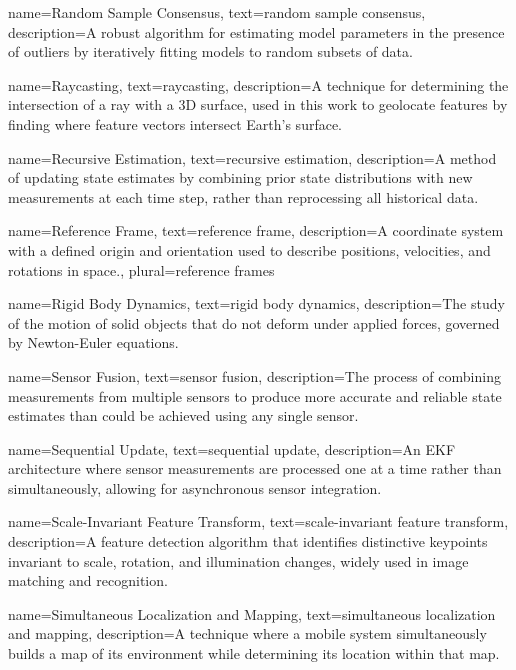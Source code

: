 {
	name=Random Sample Consensus,
	text=random sample consensus,
	description={A robust algorithm for estimating model parameters in the presence of outliers by iteratively fitting models to random subsets of data.}
}

{
	name=Raycasting,
	text=raycasting,
	description={A technique for determining the intersection of a ray with a 3D surface, used in this work to geolocate features by finding where feature vectors intersect Earth's surface.}
}

{
	name=Recursive Estimation,
	text=recursive estimation,
	description={A method of updating state estimates by combining prior state distributions with new measurements at each time step, rather than reprocessing all historical data.}
}

{
	name=Reference Frame,
	text=reference frame,
	description={A coordinate system with a defined origin and orientation used to describe positions, velocities, and rotations in space.},
	plural=reference frames
}

{
	name=Rigid Body Dynamics,
	text=rigid body dynamics,
	description={The study of the motion of solid objects that do not deform under applied forces, governed by Newton-Euler equations.}
}

{
	name=Sensor Fusion,
	text=sensor fusion,
	description={The process of combining measurements from multiple sensors to produce more accurate and reliable state estimates than could be achieved using any single sensor.}
}

{
	name=Sequential Update,
	text=sequential update,
	description={An EKF architecture where sensor measurements are processed one at a time rather than simultaneously, allowing for asynchronous sensor integration.}
}

{
	name=Scale-Invariant Feature Transform,
	text=scale-invariant feature transform,
	description={A feature detection algorithm that identifies distinctive keypoints invariant to scale, rotation, and illumination changes, widely used in image matching and recognition.}
}

{
	name=Simultaneous Localization and Mapping,
	text=simultaneous localization and mapping,
	description={A technique where a mobile system simultaneously builds a map of its environment while determining its location within that map.}
}

